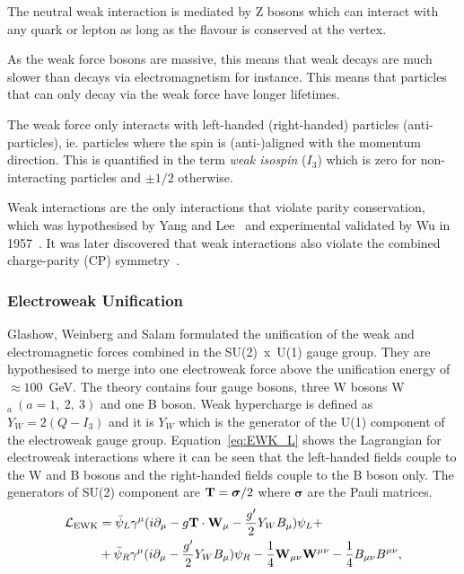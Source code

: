 The neutral weak interaction is mediated by Z bosons which can interact with any quark or lepton as long as the flavour is conserved at the vertex.

As the weak force bosons are massive, this means that weak decays are much slower than decays via electromagnetism for instance. This means that particles that can only decay via the weak force have longer lifetimes. 

The weak force only interacts with left-handed (right-handed) particles (anti-particles), ie. particles where the spin is (anti-)aligned with the momentum direction. This is quantified in the term \emph{weak isospin} ($I_{3}$) which is zero for non-interacting particles and $\pm1/2$ otherwise.

Weak interactions are the only interactions that violate parity conservation, which was hypothesised by Yang and Lee~\cite{PhysRev.104.254} and experimental validated by Wu in 1957~\cite{PhysRev.105.1413}. It was later discovered that weak interactions also violate the combined charge-parity (CP) symmetry~\cite{Cronin2012,PhysRevLett.13.138}.


\subsubsection{Electroweak Unification}

Glashow, Weinberg and Salam formulated the unification of the weak and electromagnetic forces combined in the SU(2)~x~U(1) gauge group. They are hypothesised to merge into one electroweak force above the unification energy of $\approx 100$~GeV. The theory contains four gauge bosons, three W bosons W$_{a}~(a=1,~2,~3)$ and one B boson. Weak hypercharge is defined as $Y_{W} = 2(Q-I_{3})$ and it is $Y_W$ which is the generator of the U(1) component of the electroweak gauge group. Equation~\ref{eq:EWK_L} shows the Lagrangian for electroweak interactions where it can be seen that the left-handed fields couple to the W and B bosons and the right-handed fields couple to the B boson only. The generators of SU(2) component are ${\bf T} = \boldsymbol{\sigma}/2$ where $\boldsymbol{\sigma}$ are the Pauli matrices.
\begin{equation}
\label{eq:EWK_L}
\begin{split}
\mathcal{L}_\textrm{EWK} & = \bar{\psi}_L \gamma^\mu ( i\partial_\mu  - g \mathbf{T} \cdot \mathbf{W}_\mu - \frac{g'}{2} Y_{W}
B_\mu) \psi_L + \\ & + \bar{\psi}_R \gamma^\mu (i \partial_\mu - \frac{g'}{2} Y_{W} B_\mu) \psi_R -
\frac{1}{4}\mathbf{W}_{\mu\nu} \mathbf{W}^{\mu\nu} -\frac{1}{4}B_{\mu\nu} B^{\mu\nu},
\end{split}
\end{equation}

